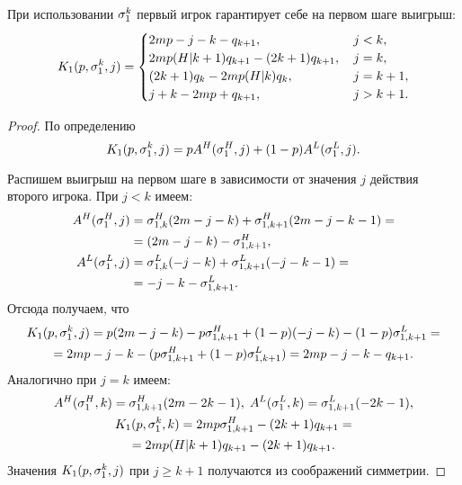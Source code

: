 \begin{utver}
\label{utver:lower_bound:general_step}
При использовании $ \sigma^k_1 $ первый игрок гарантирует себе на первом шаге выигрыш:
\begin{equation}
\label{eq:lower_bound:general_step}
K_1(p, \sigma^k_1, j) = \begin{cases}
    2mp - j - k - q_{k+1}, &\, j < k, \\
    2mp(H|k+1)q_{k+1} - (2k+1)q_{k+1}, &\, j = k, \\
    (2k + 1)q_k - 2mp(H|k)q_k, &\, j = k+1, \\
    j + k - 2mp + q_{k+1}, &\, j > k + 1.
\end{cases}
\end{equation}
\end{utver}
\begin{proof}
По определению
\begin{equation*}
\label{eq:payoff:stage}
    K_1(p, \sigma^k_1, j) = pA^H(\sigma^H_1, j) + (1-p)A^L(\sigma^L_1, j).
\end{equation*}

Распишем выигрыш на первом шаге в зависимости от значения $ j $ действия второго игрока.
При $ j < k $ имеем:
\begin{align*}
  A^H(\sigma^H_1, j)
  &= \sigma^H_{1,k} (2m - j - k) + \sigma^H_{1,k+1} (2m - j - k - 1) = \\
  &= (2m - j - k) - \sigma^H_{1,k+1},\\
  A^L(\sigma^L_1, j)
  &= \sigma^L_{1,k} (-j - k) + \sigma^L_{1,k+1} (-j - k - 1) = \\
  &= - j - k - \sigma^L_{1,k+1}.
\end{align*}
Отсюда получаем, что
\begin{multline*}
  K_1(p, \sigma^k_1, j) 
  = p (2m - j - k) - p\sigma^H_{1,k+1} + 
      (1-p)(-j - k) - (1-p)\sigma^L_{1,k+1} = \\
  = 2mp - j - k - (p\sigma^H_{1,k+1} + (1-p)\sigma^L_{1,k+1}) = 2mp - j - k - q_{k+1}.
\end{multline*}
Аналогично при $ j = k $ имеем:
\begin{gather*}
  A^H(\sigma^H_1, k) = \sigma^H_{1,k+1} (2m - 2k - 1), \;
  A^L(\sigma^L_1, k) = \sigma^L_{1,k+1} (-2k - 1), \\
  K_1(p, \sigma^k_1, k) = 2mp\sigma^H_{1,k+1} - (2k+1)q_{k+1} = \\ 
  = 2mp(H|k+1)q_{k+1} - (2k+1)q_{k+1}.
\end{gather*}
Значения $ K_1(p, \sigma^k_1, j) $ при $ j \geq k + 1 $ получаются из соображений симметрии.
\end{proof}

